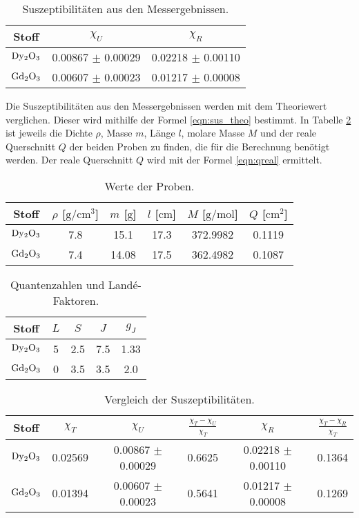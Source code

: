 \begin{table}
  \centering
  \caption{Suszeptibilitäten aus den Messergebnissen.}
  \label{tab:Suszeptibilität_Praxis}
  \begin{tabular}{c c c}
    \toprule
    {Stoff} & {$\chi_U$} & {$\chi_R$} \\
    \midrule
    $\ce{Dy2O3}$ & 0.00867 $\pm$ 0.00029 & 0.02218 $\pm$ 0.00110 \\
    $\ce{Gd2O3}$ & 0.00607 $\pm$ 0.00023 & 0.01217 $\pm$ 0.00008 \\
    \bottomrule
  \end{tabular}
\end{table}

Die Suszeptibilitäten aus den Messergebnissen werden mit dem Theoriewert verglichen.
Dieser wird mithilfe der Formel \eqref{eqn:sus_theo} bestimmt.
In Tabelle \ref{tab:Proben} ist jeweils die Dichte $\rho$, Masse $m$, Länge $l$, molare Masse $M$ und der reale Querschnitt $Q$ der beiden Proben zu finden, die für die Berechnung benötigt werden.
Der reale Querschnitt $Q$ wird mit der Formel \eqref{eqn:qreal} ermittelt.

\begin{table}
  \centering
  \caption{Werte der Proben.}
  \label{tab:Proben}
  \begin{tabular}{c c c c c c }
    \toprule
    {Stoff} & {$\rho$ [$\si{\gram\per\centi\metre\cubed}$]} & {$m$ [$\si{\gram}$]} & {$l$ [$\si{\centi\metre}$]} & {$M$ [$\si{\gram\per\mole}$]} & {$Q$ [$\si{\centi\metre\squared}$]}\\
    \midrule
    $\ce{Dy2O3}$ & 7.8 & 15.1 & 17.3 & 372.9982 & 0.1119\\
    $\ce{Gd2O3}$ & 7.4 & 14.08 & 17.5 & 362.4982 & 0.1087\\
    \bottomrule
  \end{tabular}
\end{table}

\begin{table}
  \centering
  \caption{Quantenzahlen und Landé-Faktoren.}
  \begin{tabular}{c c c c c }
    \toprule
    {Stoff} & {$L$} & {$S$} & {$J$} & {$g_J$}\\
    \midrule
    $\ce{Dy2O3}$ & 5 & 2.5 & 7.5 & 1.33\\
    $\ce{Gd2O3}$ & 0 & 3.5 & 3.5 & 2.0\\
    \bottomrule
  \end{tabular}
\end{table}

\begin{table}
  \centering
  \caption{Vergleich der Suszeptibilitäten.}
  \label{tab:vergleich}
  \begin{tabular}{c c c c c c}
    \toprule
    {Stoff} & {$\chi_T$} &{$\chi_U$} & {$\frac{\chi_T - \chi_U}{\chi_T}$} & {$\chi_R$} & {$\frac{\chi_T - \chi_R}{\chi_T}$}\\
    \midrule
    $\ce{Dy2O3}$ & 0.02569 & 0.00867 $\pm$ 0.00029 & 0.6625 & 0.02218 $\pm$ 0.00110 & 0.1364 \\
    $\ce{Gd2O3}$ & 0.01394 & 0.00607 $\pm$ 0.00023 & 0.5641 & 0.01217 $\pm$ 0.00008 & 0.1269 \\
    \bottomrule
  \end{tabular}
\end{table}